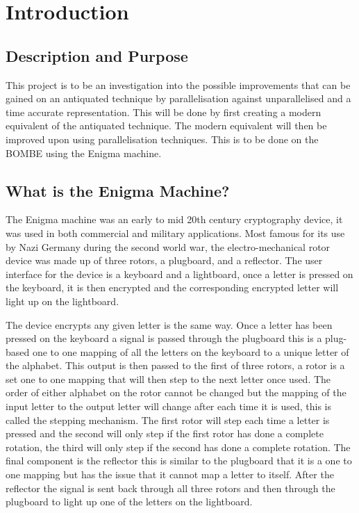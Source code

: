\documentclass[12pt,a4paper]{article}
\begin{document}
\section{Introduction}

\subsection{Description and Purpose}

This project is to be an investigation into the possible improvements that can be gained on an antiquated technique by parallelisation against unparallelised and a time accurate representation. This will be done by first creating a modern equivalent of the antiquated technique. The modern equivalent will then be improved upon using parallelisation techniques. This is to be done on the BOMBE using the Enigma machine.

\subsection{What is the Enigma Machine?}

The Enigma machine was an early to mid 20th century cryptography device, it was used in both commercial and military applications. Most famous for its use by Nazi Germany during the second world war, the electro-mechanical rotor device was made up of three rotors, a plugboard, and a reflector. The user interface for the device is a keyboard and a lightboard, once a letter is pressed on the keyboard, it is then encrypted and the corresponding encrypted letter will light up on the lightboard. 

The device encrypts any given letter is the same way. Once a letter has been pressed on the keyboard a signal is passed through the plugboard this is a plug-based one to one mapping of all the letters on the keyboard to a unique letter of the alphabet. This output is then passed to the first of three rotors, a rotor is a set one to one mapping that will then step to the next letter once used. The order of either alphabet on the rotor cannot be changed but the mapping of the input letter to the output letter will change after each time it is used, this is called the stepping mechanism. The first rotor will step each time a letter is pressed and the second will only step if the first rotor has done a complete rotation, the third will only step if the second has done a complete rotation. The final component is the reflector this is similar to the plugboard that it is a one to one mapping but has the issue that it cannot map a letter to itself. After the reflector the signal is sent back through all three rotors and then through the plugboard to light up one of the letters on the lightboard. 
\end{document}

